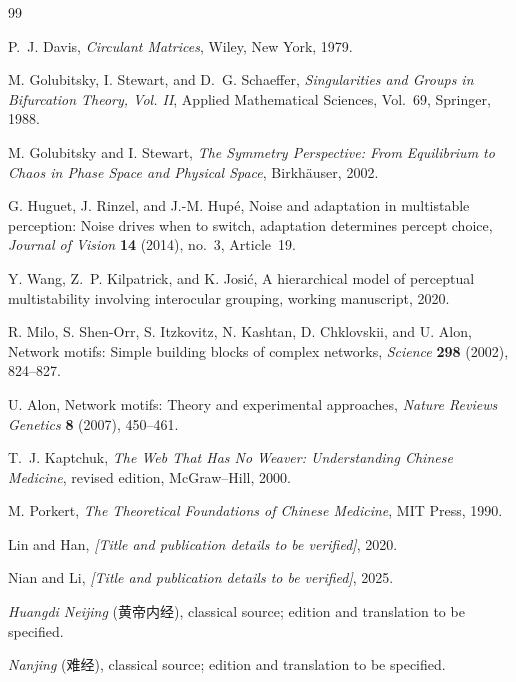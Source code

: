 \documentclass[11pt, reqno]{amsart}
\theoremstyle{definition}
\theoremstyle{remark}
\begin{document}

\begin{thebibliography}{99}

P.~J. Davis,
\emph{Circulant Matrices},
Wiley, New York, 1979.

M. Golubitsky, I. Stewart, and D.~G. Schaeffer,
\emph{Singularities and Groups in Bifurcation Theory, Vol. II},
Applied Mathematical Sciences, Vol.~69, Springer, 1988.

M. Golubitsky and I. Stewart,
\emph{The Symmetry Perspective: From Equilibrium to Chaos in Phase Space and
Physical Space},
Birkh\"auser, 2002.

G. Huguet, J. Rinzel, and J.-M. Hup\'e,
Noise and adaptation in multistable perception: Noise drives when to switch,
adaptation determines percept choice,
\emph{Journal of Vision} \textbf{14} (2014), no.~3, Article~19.

Y. Wang, Z.~P. Kilpatrick, and K. Josi\'c,
A hierarchical model of perceptual multistability involving interocular
grouping,
working manuscript, 2020.

R. Milo, S. Shen-Orr, S. Itzkovitz, N. Kashtan, D. Chklovskii, and U. Alon,
Network motifs: Simple building blocks of complex networks,
\emph{Science} \textbf{298} (2002), 824--827.

U. Alon,
Network motifs: Theory and experimental approaches,
\emph{Nature Reviews Genetics} \textbf{8} (2007), 450--461.

T.~J. Kaptchuk,
\emph{The Web That Has No Weaver: Understanding Chinese Medicine},
revised edition, McGraw--Hill, 2000.

M. Porkert,
\emph{The Theoretical Foundations of Chinese Medicine},
MIT Press, 1990.

Lin and Han,
\emph{[Title and publication details to be verified]},
2020.

Nian and Li,
\emph{[Title and publication details to be verified]},
2025.

\emph{Huangdi Neijing} (黄帝内经),
classical source; edition and translation to be specified.

\emph{Nanjing} (难经),
classical source; edition and translation to be specified.

\end{thebibliography}
\end{document}
